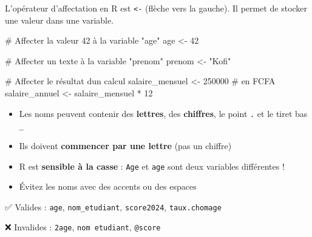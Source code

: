 \documentclass[
  french,
  11pt,
  a4paper,
]{article}
\newenvironment{Shaded}{}{}
\newcommand{\CommentTok}[1]{\textcolor[rgb]{0.42,0.45,0.49}{#1}}
\newcommand{\DecValTok}[1]{\textcolor[rgb]{0.00,0.36,0.77}{#1}}
\newcommand{\NormalTok}[1]{\textcolor[rgb]{0.14,0.16,0.18}{#1}}
\newcommand{\OtherTok}[1]{\textcolor[rgb]{0.44,0.26,0.76}{#1}}
\newcommand{\SpecialCharTok}[1]{\textcolor[rgb]{0.00,0.36,0.77}{#1}}
\newcommand{\StringTok}[1]{\textcolor[rgb]{0.01,0.18,0.38}{#1}}
\providecommand{\tightlist}{%
  \setlength{\itemsep}{0pt}\setlength{\parskip}{0pt}}
\begin{document}
L'opérateur d'affectation en R est \texttt{\textless{}-} (flèche vers la
gauche). Il permet de stocker une valeur dans une variable.

\begin{Shaded}
\begin{Highlighting}[]
\CommentTok{\# Affecter la valeur 42 à la variable "age"}
\NormalTok{age }\OtherTok{\textless{}{-}} \DecValTok{42}

\CommentTok{\# Affecter un texte à la variable "prenom"}
\NormalTok{prenom }\OtherTok{\textless{}{-}} \StringTok{"Kofi"}

\CommentTok{\# Affecter le résultat d\textquotesingle{}un calcul}
\NormalTok{salaire\_mensuel }\OtherTok{\textless{}{-}} \DecValTok{250000}  \CommentTok{\# en FCFA}
\NormalTok{salaire\_annuel }\OtherTok{\textless{}{-}}\NormalTok{ salaire\_mensuel }\SpecialCharTok{*} \DecValTok{12}
\end{Highlighting}
\end{Shaded}

\begin{tcolorbox}[enhanced jigsaw, arc=.35mm, bottomrule=.15mm, bottomtitle=1mm, breakable, colback=white, colbacktitle=quarto-callout-tip-color!10!white, colframe=quarto-callout-tip-color-frame, coltitle=black, left=2mm, leftrule=.75mm, opacityback=0, opacitybacktitle=0.6, rightrule=.15mm, title=\textcolor{quarto-callout-tip-color}{\faLightbulb}\hspace{0.5em}{Règles de nommage des variables}, titlerule=0mm, toprule=.15mm, toptitle=1mm]

\begin{itemize}
\tightlist
\item
  Les noms peuvent contenir des \textbf{lettres}, des \textbf{chiffres},
  le point \texttt{.} et le tiret bas \texttt{\_}
\item
  Ils doivent \textbf{commencer par une lettre} (pas un chiffre)
\item
  R est \textbf{sensible à la casse} : \texttt{Age} et \texttt{age} sont
  deux variables différentes !
\item
  Évitez les noms avec des accents ou des espaces
\end{itemize}

✅ Valides : \texttt{age}, \texttt{nom\_etudiant}, \texttt{score2024},
\texttt{taux.chomage}

❌ Invalides : \texttt{2age}, \texttt{nom\ etudiant}, \texttt{@score}

\end{tcolorbox}
\end{document}
